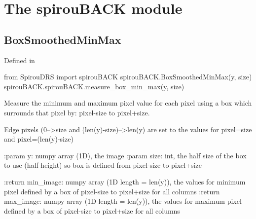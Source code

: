 
\clearpage
\newpage
\noindent\begin{minipage}{\textwidth}
\section{The spirouBACK module}
\label{ch:the_module:spirouBACK}


\subsection{BoxSmoothedMinMax}
Defined in \spirouBACK{}
\begin{pythonbox}
from SpirouDRS import spirouBACK
spirouBACK.BoxSmoothedMinMax(y, size)
spirouBACK.spirouBACK.measure_box_min_max(y, size)
\end{pythonbox}
\begin{pythondocstring}
Measure the minimum and maximum pixel value for each pixel using a box which
surrounds that pixel by:  pixel-size to pixel+size.

Edge pixels (0-->size and (len(y)-size)-->len(y) are
set to the values for pixel=size and pixel=(len(y)-size)

:param y: numpy array (1D), the image
:param size: int, the half size of the box to use (half height)
             so box is defined from  pixel-size to pixel+size

:return min_image: numpy array (1D length = len(y)), the values
                   for minimum pixel defined by a box of pixel-size to
                   pixel+size for all columns
:return max_image: numpy array (1D length = len(y)), the values
                   for maximum pixel defined by a box of pixel-size to
                   pixel+size for all columns
\end{pythondocstring}
\end{minipage}


